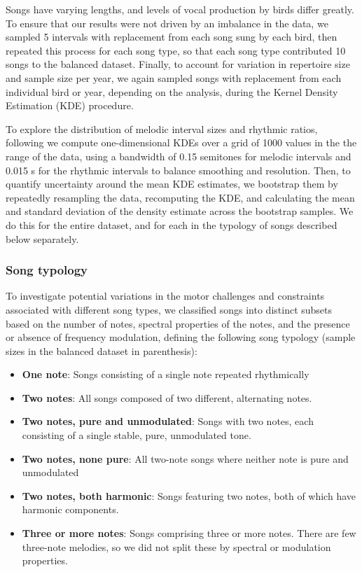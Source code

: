 Songs have varying lengths, and levels of vocal production by birds differ greatly. To ensure that our results were not driven by an imbalance in the data, we sampled 5 intervals with replacement from each song sung by each bird, then repeated this process for each song type, so that each song type contributed 10 songs to the balanced dataset. Finally, to account for variation in repertoire size and sample size per year, we again sampled songs with replacement from each individual bird or year, depending on the analysis, during the Kernel Density Estimation (KDE) procedure.

To explore the distribution of melodic interval sizes and rhythmic ratios, following \textcite{anglada-tort2023} we compute one-dimensional KDEs over a grid of 1000 values in the the range of the data, using a bandwidth of 0.15 semitones for melodic intervals and 0.015 s for the rhythmic intervals to balance smoothing and resolution. Then, to quantify uncertainty around the mean KDE estimates, we bootstrap them by repeatedly resampling the data, recomputing the KDE, and calculating the mean and standard deviation of the density estimate across the bootstrap samples. We do this for the entire dataset, and for each in the typology of songs described below separately.


\subsubsection{Song typology}
\label{c5:typology}
To investigate potential variations in the motor challenges and constraints associated with different song types, we classified songs into distinct subsets based on the number of notes, spectral properties of the notes, and the presence or absence of frequency modulation, defining the following song typology (sample sizes in the balanced dataset in parenthesis):

\begin{itemize}
    \item \textbf{One note}: Songs consisting of a single note repeated rhythmically
    \item \textbf{Two notes}: All songs composed of two different, alternating notes.
    \item \textbf{Two notes, pure and unmodulated}: Songs with two notes, each consisting of a single stable, pure, unmodulated tone.
    \item \textbf{Two notes, none pure}: All two-note songs where neither note is pure and unmodulated
    \item \textbf{Two notes, both harmonic}: Songs featuring two notes, both of which have harmonic components.
    \item \textbf{Three or more notes}: Songs comprising three or more notes. There are few three-note melodies, so we did not split these by spectral or modulation properties.
\end{itemize}

